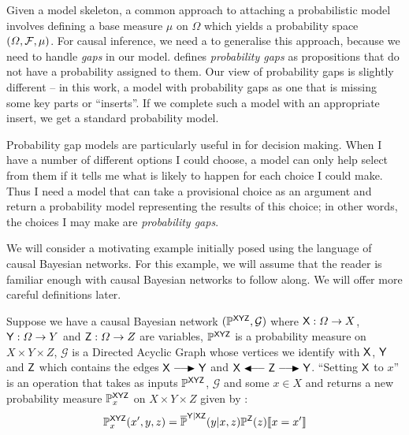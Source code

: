 Given a model skeleton, a common approach to attaching a probabilistic model involves defining a base measure $\mu$ on $\Omega$ which yields a probability space $(\Omega,\mathcal{F},\mu)$. For causal inference, we need a to generalise this approach, because we need to handle \emph{gaps} in our model. \citet{hajek_what_2003} defines \emph{probability gaps} as propositions that do not have a probability assigned to them. Our view of probability gaps is slightly different -- in this work, a model with probability gaps as one that is missing some key parts or ``inserts''. If we complete such a model with an appropriate insert, we get a standard probability model.

Probability gap models are particularly useful in for decision making. When I have a number of different options I could choose, a model can only help select from them if it tells me what is likely to happen for each choice I could make. Thus I need a model that can take a provisional choice as an argument and return a probability model representing the results of this choice; in other words, the choices I may make are \emph{probability gaps}.

We will consider a motivating example initially posed using the language of causal Bayesian networks. For this example, we will assume that the reader is familiar enough with causal Bayesian networks to follow along. We will offer more careful definitions later.

Suppose we have a causal Bayesian network $(\mathbb{P}^{\mathsf{XYZ}},\mathcal{G})$ where $\mathsf{X}:\Omega\to X$, $\mathsf{Y}:\Omega\to Y$ and $\mathsf{Z}:\Omega\to Z$ are variables, $\mathbb{P}^{\mathsf{XYZ}}$ is a probability measure on $X\times Y\times Z$, $\mathcal{G}$ is a Directed Acyclic Graph whose vertices we identify with $\mathsf{X}$, $\mathsf{Y}$ and $\mathsf{Z}$ which contains the edges $\RV{X}\longrightarrowRHD \RV{Y}$ and $\RV{X}\longleftarrowRHD \RV{Z} \longrightarrowRHD \RV{Y}$. ``Setting $\mathsf{X}$ to $x$'' is an operation that takes as inputs $\mathbb{P}^{\mathsf{XYZ}}$, $\mathcal{G}$ and some $x\in X$ and returns a new probability measure $\mathbb{P}_x^{\mathsf{XYZ}}$ on $X\times Y\times Z$ given by \citep[page ~24]{pearl_causality:_2009}:
\begin{align}
	\mathbb{P}^{\mathsf{XYZ}}_{x}(x',y,z)=\overline{\mathbb{P}}^{\mathsf{Y|XZ}}(y|x,z)\mathbb{P}^{\mathsf{Z}}(z)\llbracket x=x' \rrbracket\label{eq:truncated_fac}
\end{align}


